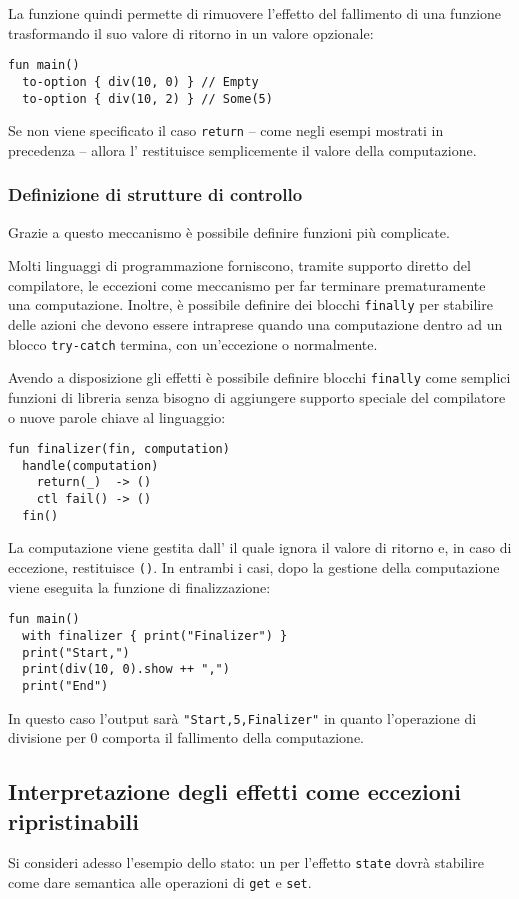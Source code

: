 La funzione quindi permette di rimuovere l'effetto del fallimento di una funzione trasformando il suo valore di ritorno in un valore opzionale:
\begin{lstlisting}[language=koka]
fun main()
  to-option { div(10, 0) } // Empty
  to-option { div(10, 2) } // Some(5)
\end{lstlisting}

Se non viene specificato il caso \lstinline{return} -- come negli esempi mostrati in precedenza -- allora l' restituisce semplicemente il valore della computazione.

\subsubsection{Definizione di strutture di controllo}
Grazie a questo meccanismo è possibile definire funzioni più complicate.

Molti linguaggi di programmazione forniscono, tramite supporto diretto del compilatore, le eccezioni come meccanismo per far terminare prematuramente una computazione.
Inoltre, è possibile definire dei blocchi \lstinline{finally} per stabilire delle azioni che devono essere intraprese quando una computazione dentro ad un blocco \lstinline{try-catch} termina, con un'eccezione o normalmente.

Avendo a disposizione gli effetti è possibile definire blocchi \lstinline{finally} come semplici funzioni di libreria senza bisogno di aggiungere supporto speciale del compilatore o nuove parole chiave al linguaggio:
\begin{lstlisting}[language=koka]
fun finalizer(fin, computation)
  handle(computation)
    return(_)  -> ()
    ctl fail() -> ()
  fin()
\end{lstlisting}
La computazione viene gestita dall' il quale ignora il valore di ritorno e, in caso di eccezione, restituisce \lstinline{()}. In entrambi i casi, dopo la gestione della computazione viene eseguita la funzione di finalizzazione:
\begin{lstlisting}[language=koka]
fun main()
  with finalizer { print("Finalizer") }
  print("Start,")
  print(div(10, 0).show ++ ",")
  print("End")
\end{lstlisting}
In questo caso l'output sarà \lstinline{"Start,5,Finalizer"} in quanto l'operazione di divisione per 0 comporta il fallimento della computazione.

\subsection{Interpretazione degli effetti come eccezioni ripristinabili}
Si consideri adesso l'esempio dello stato: un  per l'effetto \lstinline{state} dovrà stabilire come dare semantica alle operazioni di \lstinline{get} e \lstinline{set}.

